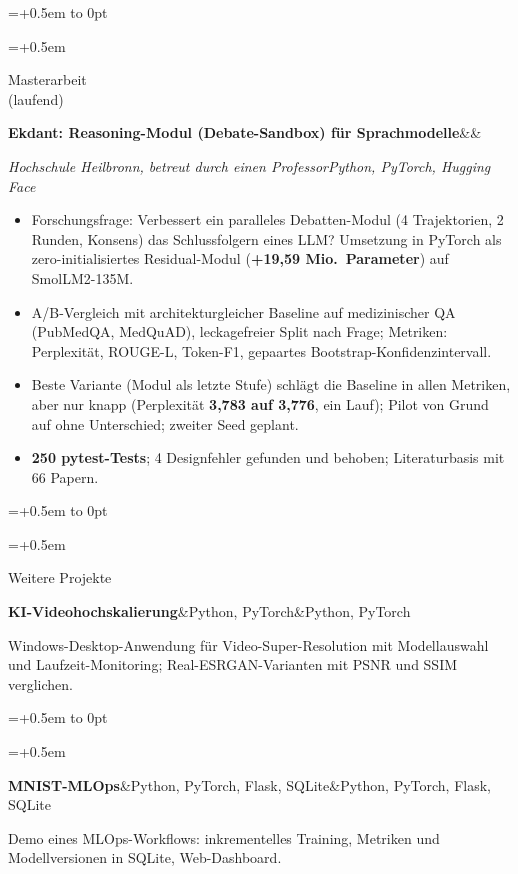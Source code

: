 \documentclass[10pt,a4paper]{article}
\newlength{\leftcol}\setlength{\leftcol}{2.45cm}
\newcommand{\gap}{0.5em}
\newcommand{\sep}{\hspace{0.45em}\textbar\hspace{0.45em}}
\newcommand{\entry}[3]{%
  \begingroup\raggedright\leftskip=\dimexpr\leftcol+\gap\relax\noindent
  \hspace*{-\dimexpr\leftcol+\gap\relax}%
  \vtop to 0pt{\hsize=\dimexpr\leftcol+\gap\relax\raggedright\small\color{mid}\noindent #1\par\vss}%
  #2\par #3\par\endgroup\vspace{4pt}}
\newcommand{\etitle}[2]{\textbf{#1}\ifx&#2&\else\textcolor{mid}{\sep}#2\fi}
\newcommand{\stack}[1]{{\small\itshape\color{mid}#1}\par\vspace{1pt}}
\begin{document}
\newpage
\entry{Masterarbeit\\(laufend)}
  {\etitle{Ekdant: Reasoning-Modul (Debate-Sandbox) für Sprachmodelle}{}}
  {\stack{Hochschule Heilbronn, betreut durch einen Professor\sep Python, PyTorch, Hugging Face}
  \begin{itemize}
    \item Forschungsfrage: Verbessert ein paralleles Debatten-Modul (4 Trajektorien, 2 Runden, Konsens) das Schlussfolgern eines LLM? Umsetzung in PyTorch als zero-initialisiertes Residual-Modul (\textbf{+19,59 Mio.\ Parameter}) auf SmolLM2-135M.
    \item A/B-Vergleich mit architekturgleicher Baseline auf medizinischer QA (PubMedQA, MedQuAD), leckagefreier Split nach Frage; Metriken: Perplexität, ROUGE-L, Token-F1, gepaartes Bootstrap-Konfidenzintervall.
    \item Beste Variante (Modul als letzte Stufe) schlägt die Baseline in allen Metriken, aber nur knapp (Perplexität \textbf{3,783 auf 3,776}, ein Lauf); Pilot von Grund auf ohne Unterschied; zweiter Seed geplant.
    \item \textbf{250 pytest-Tests}; 4 Designfehler gefunden und behoben; Literaturbasis mit 66 Papern.
  \end{itemize}}
\entry{Weitere Projekte}
  {\etitle{KI-Videohochskalierung}{Python, PyTorch}}
  {\small Windows-Desktop-Anwendung für Video-Super-Resolution mit Modellauswahl und Laufzeit-Monitoring; Real-ESRGAN-Varianten mit PSNR und SSIM verglichen.}
\entry{\strut}
  {\etitle{MNIST-MLOps}{Python, PyTorch, Flask, SQLite}}
  {\small Demo eines MLOps-Workflows: inkrementelles Training, Metriken und Modellversionen in SQLite, Web-Dashboard.}

\end{document}
